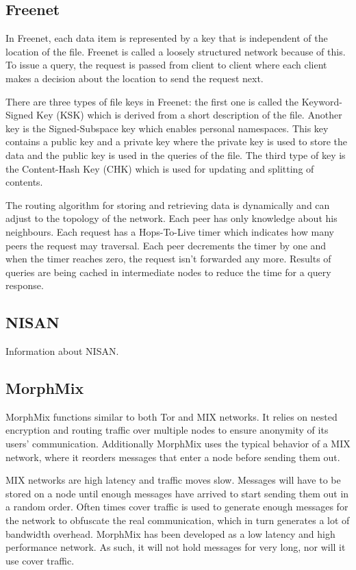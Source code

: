 \documentclass[journal]{IEEEtran}
\begin{document}
		\subsection{Freenet}
			In Freenet, each data item is represented by a key that is independent of the location of the file. Freenet is called a loosely structured network because of this. To issue a query, the request is passed from client to client where each client makes a decision about the location to send the request next.
		
			There are three types of file keys in Freenet: the first one is called the Keyword-Signed Key (KSK) which is derived from a short description of the file. Another key is the Signed-Subspace key which enables personal namespaces. This key contains a public key and a private key where the private key is used to store the data and the public key is used in the queries of the file. The third type of key is the Content-Hash Key (CHK) which is used for updating and splitting of contents.
		
			The routing algorithm for storing and retrieving data is dynamically and can adjust to the topology of the network. Each peer has only knowledge about his neighbours. Each request has a Hops-To-Live timer which indicates how many peers the request may traversal. Each peer decrements the timer by one and when the timer reaches zero, the request isn't forwarded any more. Results of queries are being cached in intermediate nodes to reduce the time for a query response.
			
		\subsection{NISAN}
			Information about NISAN.
			
		\subsection{MorphMix}
			MorphMix functions similar to both Tor and MIX networks. It relies on nested encryption and routing traffic over multiple nodes to ensure anonymity of its users' communication. Additionally MorphMix uses the typical behavior of a MIX network, where it reorders messages that enter a node before sending them out.
			
			MIX networks are high latency and traffic moves slow. Messages will have to be stored on a node until enough messages have arrived to start sending them out in a random order. Often times cover traffic is used to generate enough messages for the network to obfuscate the real communication, which in turn generates a lot of bandwidth overhead. MorphMix has been developed as a low latency and high performance network. As such, it will not hold messages for very long, nor will it use cover traffic.
			
\end{document}
